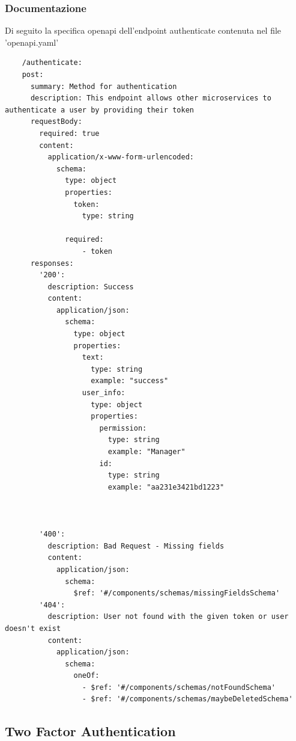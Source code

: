 \documentclass{report}
\begin{document}
\subsubsection*{Documentazione}
Di seguito la specifica openapi dell'endpoint authenticate contenuta nel file 'openapi.yaml'
\begin{verbatim}
	/authenticate:
    post:
      summary: Method for authentication 
      description: This endpoint allows other microservices to authenticate a user by providing their token
      requestBody:
        required: true
        content:
          application/x-www-form-urlencoded:
            schema:
              type: object
              properties:
                token:
                  type: string
                  
              required:
                  - token
      responses:
        '200':
          description: Success
          content:
            application/json:
              schema:
                type: object
                properties:
                  text:
                    type: string
                    example: "success"
                  user_info:
                    type: object
                    properties:
                      permission:
                        type: string
                        example: "Manager"
                      id:
                        type: string
                        example: "aa231e3421bd1223"

      

        '400':
          description: Bad Request - Missing fields 
          content:
            application/json:
              schema:
                $ref: '#/components/schemas/missingFieldsSchema'
        '404':
          description: User not found with the given token or user doesn't exist 
          content:
            application/json:
              schema:
                oneOf:
                  - $ref: '#/components/schemas/notFoundSchema'
                  - $ref: '#/components/schemas/maybeDeletedSchema'

\end{verbatim}
\subsection{Two Factor Authentication}
\end{document}
